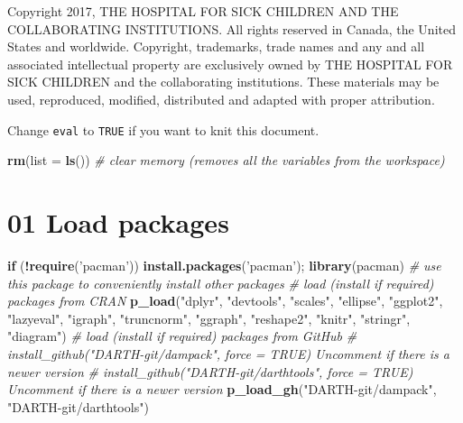 \documentclass[
]{article}
\newenvironment{Shaded}{\begin{snugshade}}{\end{snugshade}}
\newcommand{\CommentTok}[1]{\textcolor[rgb]{0.56,0.35,0.01}{\textit{#1}}}
\newcommand{\ControlFlowTok}[1]{\textcolor[rgb]{0.13,0.29,0.53}{\textbf{#1}}}
\newcommand{\DataTypeTok}[1]{\textcolor[rgb]{0.13,0.29,0.53}{#1}}
\newcommand{\KeywordTok}[1]{\textcolor[rgb]{0.13,0.29,0.53}{\textbf{#1}}}
\newcommand{\NormalTok}[1]{#1}
\newcommand{\OperatorTok}[1]{\textcolor[rgb]{0.81,0.36,0.00}{\textbf{#1}}}
\newcommand{\StringTok}[1]{\textcolor[rgb]{0.31,0.60,0.02}{#1}}
\begin{document}
Copyright 2017, THE HOSPITAL FOR SICK CHILDREN AND THE COLLABORATING
INSTITUTIONS. All rights reserved in Canada, the United States and
worldwide. Copyright, trademarks, trade names and any and all associated
intellectual property are exclusively owned by THE HOSPITAL FOR SICK
CHILDREN and the collaborating institutions. These materials may be
used, reproduced, modified, distributed and adapted with proper
attribution.

\newpage

Change \texttt{eval} to \texttt{TRUE} if you want to knit this document.

\begin{Shaded}
\begin{Highlighting}[]
\KeywordTok{rm}\NormalTok{(}\DataTypeTok{list =} \KeywordTok{ls}\NormalTok{())      }\CommentTok{# clear memory (removes all the variables from the workspace)}
\end{Highlighting}
\end{Shaded}

\hypertarget{load-packages}{%
\section{01 Load packages}\label{load-packages}}

\begin{Shaded}
\begin{Highlighting}[]
\ControlFlowTok{if}\NormalTok{ (}\OperatorTok{!}\KeywordTok{require}\NormalTok{(}\StringTok{'pacman'}\NormalTok{)) }\KeywordTok{install.packages}\NormalTok{(}\StringTok{'pacman'}\NormalTok{); }\KeywordTok{library}\NormalTok{(pacman) }\CommentTok{# use this package to conveniently install other packages}
\CommentTok{# load (install if required) packages from CRAN}
\KeywordTok{p_load}\NormalTok{(}\StringTok{"dplyr"}\NormalTok{, }\StringTok{"devtools"}\NormalTok{, }\StringTok{"scales"}\NormalTok{, }\StringTok{"ellipse"}\NormalTok{, }\StringTok{"ggplot2"}\NormalTok{, }\StringTok{"lazyeval"}\NormalTok{, }\StringTok{"igraph"}\NormalTok{, }\StringTok{"truncnorm"}\NormalTok{, }\StringTok{"ggraph"}\NormalTok{, }\StringTok{"reshape2"}\NormalTok{, }\StringTok{"knitr"}\NormalTok{, }\StringTok{"stringr"}\NormalTok{, }\StringTok{"diagram"}\NormalTok{)                                               }
\CommentTok{# load (install if required) packages from GitHub}
\CommentTok{# install_github("DARTH-git/dampack", force = TRUE) Uncomment if there is a newer version}
\CommentTok{# install_github("DARTH-git/darthtools", force = TRUE) Uncomment if there is a newer version}
\KeywordTok{p_load_gh}\NormalTok{(}\StringTok{"DARTH-git/dampack"}\NormalTok{, }\StringTok{"DARTH-git/darthtools"}\NormalTok{)}
\end{Highlighting}
\end{Shaded}
\end{document}
